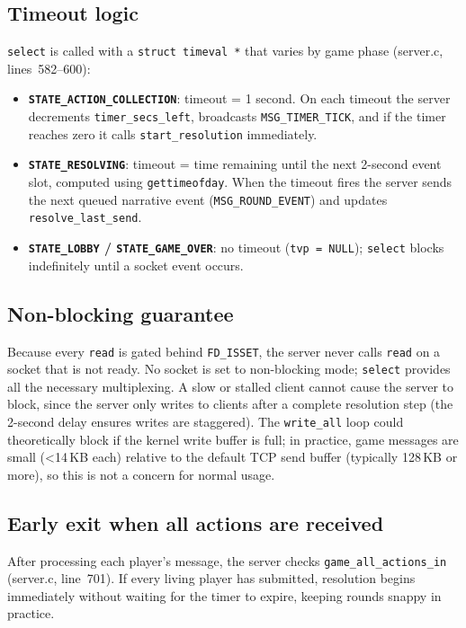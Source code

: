 \documentclass[11pt,letterpaper]{article}
\begin{document}
\subsection*{Timeout logic}

\texttt{select} is called with a \texttt{struct timeval *} that varies by game phase (server.c, lines~582--600):

\begin{itemize}[leftmargin=2em]
    \item \textbf{\texttt{STATE\_ACTION\_COLLECTION}}: timeout = 1 second. On each timeout the server decrements \texttt{timer\_secs\_left}, broadcasts \texttt{MSG\_TIMER\_TICK}, and if the timer reaches zero it calls \texttt{start\_resolution} immediately.
    \item \textbf{\texttt{STATE\_RESOLVING}}: timeout = time remaining until the next 2-second event slot, computed using \texttt{gettimeofday}. When the timeout fires the server sends the next queued narrative event (\texttt{MSG\_ROUND\_EVENT}) and updates \texttt{resolve\_last\_send}.
    \item \textbf{\texttt{STATE\_LOBBY} / \texttt{STATE\_GAME\_OVER}}: no timeout (\texttt{tvp = NULL}); \texttt{select} blocks indefinitely until a socket event occurs.
\end{itemize}

\subsection*{Non-blocking guarantee}

Because every \texttt{read} is gated behind \texttt{FD\_ISSET}, the server never calls \texttt{read} on a socket that is not ready. No socket is set to non-blocking mode; \texttt{select} provides all the necessary multiplexing. A slow or stalled client cannot cause the server to block, since the server only writes to clients after a complete resolution step (the 2-second delay ensures writes are staggered). The \texttt{write\_all} loop could theoretically block if the kernel write buffer is full; in practice, game messages are small (\textless14\,KB each) relative to the default TCP send buffer (typically 128\,KB or more), so this is not a concern for normal usage.

\subsection*{Early exit when all actions are received}

After processing each player's message, the server checks \texttt{game\_all\_actions\_in} (server.c, line~701). If every living player has submitted, resolution begins immediately without waiting for the timer to expire, keeping rounds snappy in practice.
\end{document}
